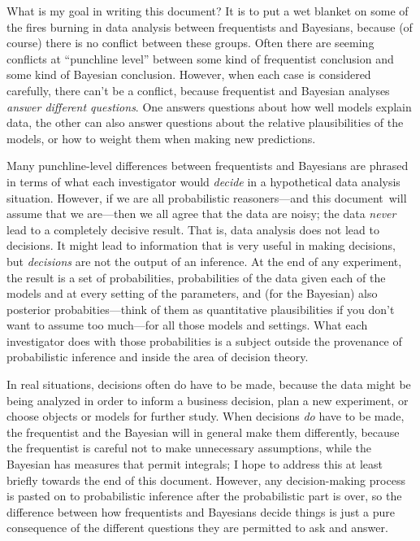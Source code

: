\documentclass[12pt,twoside]{article}
\newcommand{\documentname}{document}
\begin{document}
\noindent
What is my goal in writing this \documentname?  It is to put a wet
blanket on some of the fires burning in data analysis between
frequentists and Bayesians, because (of course) there is no conflict
between these groups.  Often there are seeming conflicts at
``punchline level'' between some kind of frequentist conclusion and
some kind of Bayesian conclusion.  However, when each case is
considered carefully, there can't be a conflict, because frequentist
and Bayesian analyses \emph{answer different questions}.  One answers
questions about how well models explain data, the other can also
answer questions about the relative plausibilities of the models, or
how to weight them when making new predictions.

Many punchline-level differences between frequentists and Bayesians
are phrased in terms of what each investigator would \emph{decide} in
a hypothetical data analysis situation.  However, if we are all
probabilistic reasoners---and this \documentname\ will assume that we
are---then we all agree that the data are noisy; the data \emph{never}
lead to a completely decisive result.  That is, data analysis does not
lead to decisions.  It might lead to information that is very useful
in making decisions, but \emph{decisions} are not the output of an
inference.  At the end of any experiment, the result is a set of
probabilities, probabilities of the data given each of the models and
at every setting of the parameters, and (for the Bayesian) also
posterior probabities---think of them as quantitative plausibilities
if you don't want to assume too much---for all those models and
settings.  What each investigator does with those probabilities is a
subject outside the provenance of probabilistic inference and inside
the area of decision theory.

In real situations, decisions often do have to be made, because the
data might be being analyzed in order to inform a business decision,
plan a new experiment, or choose objects or models for further study.
When decisions \emph{do} have to be made, the frequentist and the
Bayesian will in general make them differently, because the
frequentist is careful not to make unnecessary assumptions, while the
Bayesian has measures that permit integrals; I hope to address this at
least briefly towards the end of this \documentname.  However, any
decision-making process is pasted on to probabilistic inference after
the probabilistic part is over, so the difference between how
frequentists and Bayesians decide things is just a pure consequence of
the different questions they are permitted to ask and answer.
\end{document}
